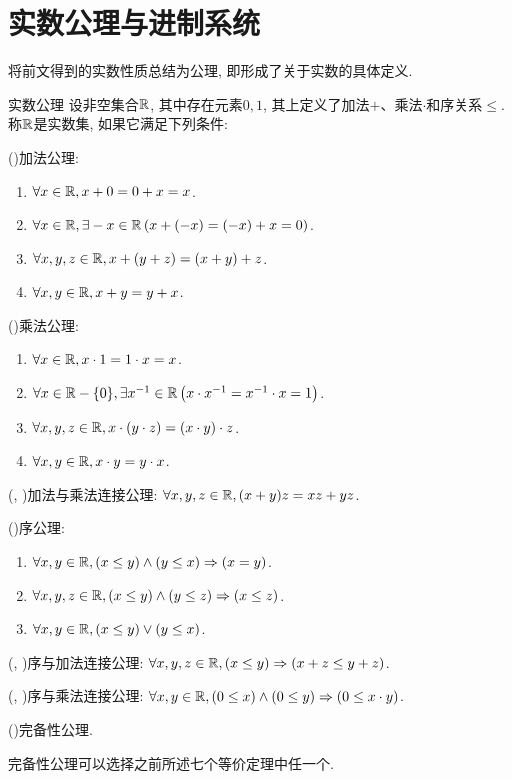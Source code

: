 \newpage
\section{实数公理与进制系统}

将前文得到的实数性质总结为公理, 即形成了关于实数的具体定义.

\begin{axiom}{实数公理}
	设非空集合$\mathbb{R}$, 其中存在元素$0, 1$, 其上定义了加法$+$、乘法$\cdot$和序关系$\leq$.称$\mathbb{R}$是实数集, 如果它满足下列条件: 
	
	(\uppercase\expandafter{})加法公理: 
	\begin{enumerate}
		\item $\forall x \in \mathbb{R} , x+0=0+x=x$.
		\item $\forall x \in \mathbb{R} , \exists -x \in \mathbb{R} \left( x+(-x)=(-x)+x=0 \right)$.
		\item $\forall x, y, z \in \mathbb{R} , x+(y+z)=(x+y)+z$.
		\item $\forall x, y \in \mathbb{R} , x+y=y+x$.
	\end{enumerate}
	
	(\uppercase\expandafter{})乘法公理: 
	\begin{enumerate}
		\item $\forall x \in \mathbb{R} , x \cdot 1=1 \cdot x=x$.
		\item $\forall x \in \mathbb{R} -\{ 0 \} , \exists x^{-1} \in \mathbb{R} \left( x \cdot x^{-1} =x^{-1} \cdot x=1 \right)$.
		\item $\forall x, y, z \in \mathbb{R} , x \cdot (y \cdot z)=(x \cdot y) \cdot z$.
		\item $\forall x, y \in \mathbb{R} , x\cdot y=y\cdot x$.
	\end{enumerate}
	
	(\uppercase\expandafter{}, \uppercase\expandafter{})加法与乘法连接公理: $\forall x, y, z \in \mathbb{R} , (x+y)z=xz+yz$.
	
	(\uppercase\expandafter{})序公理: 
	\begin{enumerate}
		\item $\forall x, y \in \mathbb{R} , (x \leq y) \wedge (y \leq x) \Rightarrow (x=y)$.
		\item $\forall x, y, z \in \mathbb{R} , (x \leq y) \wedge (y \leq z) \Rightarrow (x \leq z)$.
		\item $\forall x, y \in \mathbb{R} , (x \leq y) \vee (y \leq x)$.
	\end{enumerate}
	
	(\uppercase\expandafter{}, \uppercase\expandafter{})序与加法连接公理: $\forall x, y, z \in \mathbb{R} , (x \leq y)\Rightarrow (x+z \leq y+z)$.
	
	(\uppercase\expandafter{}, \uppercase\expandafter{})序与乘法连接公理: $\forall x, y \in \mathbb{R} , (0\leq x) \wedge (0 \leq y) \Rightarrow (0 \leq x \cdot y)$.
	
	(\uppercase\expandafter{})完备性公理.
\end{axiom}
\begin{remark}
	完备性公理可以选择之前所述七个等价定理中任一个.
\end{remark}

